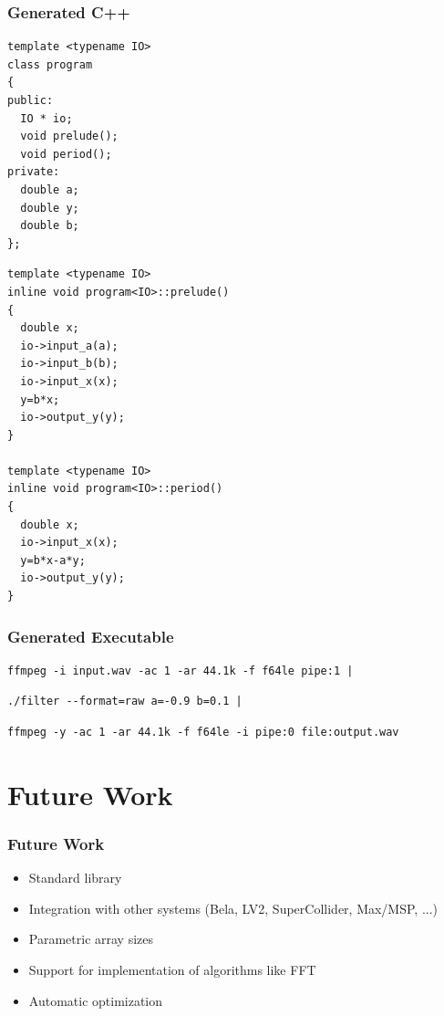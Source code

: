 \documentclass{beamer}
\begin{document}
\begin{frame}[fragile]
\frametitle{Generated C++}

\footnotesize
\begin{minipage}{0.49\linewidth}
\begin{BVerbatim}
template <typename IO>
class program
{
public:
  IO * io;
  void prelude();
  void period();
private:
  double a;
  double y;
  double b;
};
\end{BVerbatim}
\end{minipage}\hfill
\begin{minipage}{0.49\linewidth}
\begin{BVerbatim}
template <typename IO>
inline void program<IO>::prelude()
{
  double x;
  io->input_a(a);
  io->input_b(b);
  io->input_x(x);
  y=b*x;
  io->output_y(y);
}

template <typename IO>
inline void program<IO>::period()
{
  double x;
  io->input_x(x);
  y=b*x-a*y;
  io->output_y(y);
}
\end{BVerbatim}
\end{minipage}

\end{frame}


\begin{frame}[fragile]
\frametitle{Generated Executable}

\small

\begin{Verbatim}
ffmpeg -i input.wav -ac 1 -ar 44.1k -f f64le pipe:1 |
\end{Verbatim}

{
\bf
\begin{Verbatim}
./filter --format=raw a=-0.9 b=0.1 |
\end{Verbatim}
}

\begin{Verbatim}
ffmpeg -y -ac 1 -ar 44.1k -f f64le -i pipe:0 file:output.wav
\end{Verbatim}

\end{frame}

\section{Future Work}

\begin{frame}[fragile]
\frametitle{Future Work}

\begin{itemize}
\item Standard library
\item Integration with other systems (Bela, LV2, SuperCollider, Max/MSP, ...)
\item Parametric array sizes
\item Support for implementation of algorithms like FFT
\item Automatic optimization
\end{itemize}

\end{frame}
\end{document}
